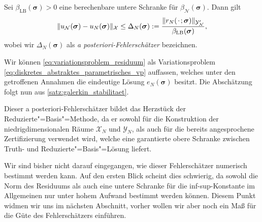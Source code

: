 \documentclass[../main.tex]{subfiles}
\begin{document}
\begin{Lemma}
\label{lemma:rbm_fehler_schranke}
    Sei $\beta_{\mathrm{LB}}(\bm \sigma) > 0$ eine berechenbare untere Schranke für $\beta_{\mathcal N}(\bm \sigma)$.
    Dann gilt
    \begin{equation}
        \lVert u_{\mathcal N}(\bm \sigma) - u_{N}(\bm \sigma)\rVert_{\mathcal X} \leq \Delta_{N}(\bm \sigma) := \frac{\lVert r_{N}({\mkern2mu\cdot\mkern2mu}; \bm \sigma)\rVert_{\mathcal Y_{\mathcal N}'}}{\beta_{\mathrm{LB}}(\bm \sigma)},
    \end{equation}
    wobei wir $\Delta_{N}(\bm \sigma)$ als \emph{a posteriori-Fehlerschätzer} bezeichnen.

    \begin{Beweis}
        Wir können \cref{eq:variationsproblem_residuum} als Variationsproblem \cref{eq:diskretes_abstraktes_parametrisches_vp} auffassen, welches unter den getroffenen Annahmen die eindeutige Lösung $e_{N}(\bm \sigma)$ besitzt.
        Die Abschätzung folgt nun aus \cref{satz:galerkin_stabilitaet}.
    \end{Beweis}
\end{Lemma}

Dieser a posteriori-Fehlerschätzer bildet das Herzstück der Reduzierte"=Basis"=Methode, da er sowohl für die Konstruktion der niedrigdimensionalen Räume $\mathcal X_{N}$ und $\mathcal Y_{N}$, als auch für die bereits angesprochene Zertifizierung verwendet wird, welche eine garantierte obere Schranke zwischen Truth- und Reduzierte"=Basis"=Lösung liefert.

Wir sind bisher nicht darauf eingegangen, wie dieser Fehlerschätzer numerisch bestimmt werden kann.
Auf den ersten Blick scheint dies schwierig, da sowohl die Norm des Residuums als auch eine untere Schranke für die inf-sup-Konstante im Allgemeinen nur unter hohem Aufwand bestimmt werden können.
Diesem Punkt widmen wir uns im nächsten Abschnitt, vorher wollen wir aber noch ein Maß für die Güte des Fehlerschätzers einführen.
\end{document}
